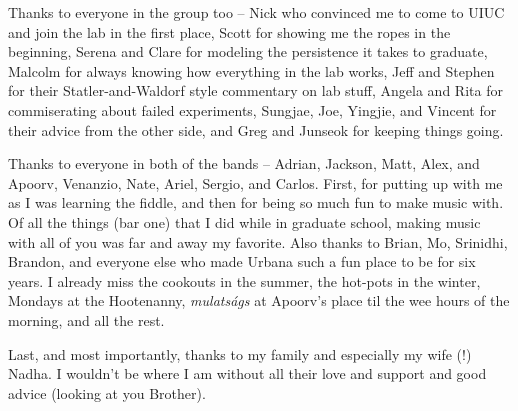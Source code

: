 \documentclass[edeposit,fullpage,draftthesis]{uiucthesis2009}
\begin{document}

Thanks to everyone in the group too -- Nick who convinced me to come to UIUC and join
the lab in the first place, Scott for showing me the ropes in the beginning, Serena and Clare 
for modeling the persistence it takes to graduate, Malcolm for always knowing how
everything in the lab works, Jeff and Stephen for their Statler-and-Waldorf style commentary
on lab stuff, Angela and Rita for commiserating about failed experiments, Sungjae, Joe, Yingjie,
and Vincent for their advice from the other side, and Greg and Junseok for keeping things going.

Thanks to everyone in both of the bands -- Adrian, Jackson, Matt, Alex, and Apoorv,
Venanzio, Nate, Ariel, Sergio, and Carlos. First, for putting up with me as I
was learning the fiddle, and then for being so much fun to make music with.
Of all the things (bar one) that I did while in graduate school, making music
with all of you was far and away my favorite. Also thanks to Brian, Mo, Srinidhi, Brandon,
and everyone else who made Urbana such a fun place to be for six years. I already miss the
cookouts in the summer, the hot-pots in the winter,
Mondays at the Hootenanny, \textit{mulats\'{a}gs} at Apoorv's place til the wee hours of the morning,
and all the rest.

Last, and most importantly, thanks to my family and especially my wife (!) Nadha.
I wouldn't be where I am without all their love and support and good advice (looking at you Brother).

\end{document}

